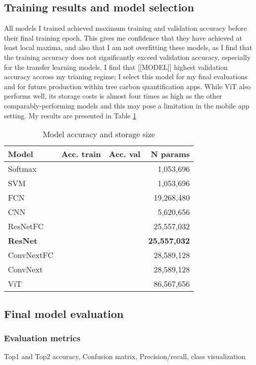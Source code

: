 \documentclass[10pt,twocolumn,letterpaper]{article}
\begin{document}
\subsection{Training results and model selection}
All models I trained achieved maximum training and validation accuracy before their final training epoch. This gives me confidence that they have achieved at least local maxima, and also that I am not overfitting these models, as I find that the training accuracy does not significantly exceed validation accuracy, especially for the transfer learning models.
I find that [[MODEL]] highest validation accuracy accross my trianing regime; I select this model for my final evaluations and for future production within tree carbon quantification apps. While ViT also performs well, its storage costs is almost four times as high as the other comparably-performing models and this may pose a limitation in the mobile app setting. My results are presented in Table \ref{tab:model_acc}

\begin{table}[!htbp]
  \begin{center}
    \small
  \begin{tabular}{|l|l|l|r|}
  \hline
  Model & Acc. train & Acc. val & N params\\
  \hline\hline
  Softmax & & & 1,053,696 \\
  SVM & & & 1,053,696\\
  FCN & & & 19,268,480\\
  CNN & & & 5,620,656\\
  ResNetFC & & & 25,557,032\\
  \textbf{ResNet} & & & \textbf{25,557,032}\\
  ConvNextFC & & & 28,589,128\\
  ConvNext & & & 28,589,128\\
  ViT & & & 86,567,656\\
  \hline
  \end{tabular}
  \end{center}
  \caption{\label{tab:model_acc} Model accuracy and storage size}
  \end{table}

\subsection{Final model evaluation}
\subsubsection{Evaluation metrics}
Top1 and Top2 accuracy, Confusion matrix, Precision/recall, class visualization
\end{document}
